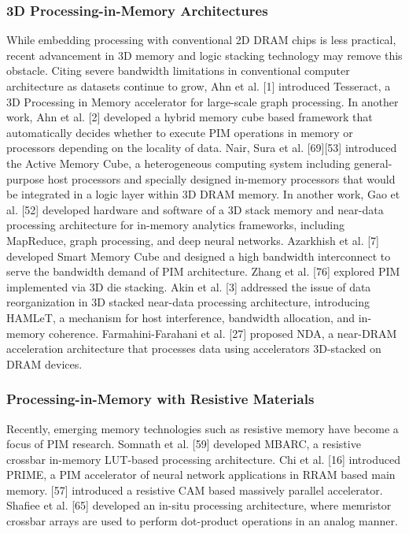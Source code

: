 \documentclass{superfri}
\begin{document}
\subsubsection{3D Processing-in-Memory Architectures}
\label{sec:3D_PiM}
While embedding processing with conventional 2D DRAM chips is less practical, recent advancement in 3D memory and logic stacking technology may remove this obstacle. Citing severe bandwidth limitations in conventional computer architecture as datasets continue to grow, Ahn et al. [1] introduced Tesseract, a 3D Processing in Memory accelerator for large-scale graph processing. In another work, Ahn et al. [2] developed a hybrid memory cube based framework that automatically decides whether to execute PIM operations in memory or processors depending on the locality of data. Nair, Sura et al. [69][53] introduced the Active Memory Cube, a heterogeneous computing system including general-purpose host processors and specially designed in-memory processors that would be integrated in a logic layer within 3D DRAM memory. In another work, Gao et al. [52] developed hardware and software of a 3D stack memory and near-data processing architecture for in-memory analytics frameworks, including MapReduce, graph processing, and deep neural networks. Azarkhish et al. [7] developed Smart Memory Cube and designed a high bandwidth interconnect to serve the bandwidth demand of PIM architecture. Zhang et al. [76] explored PIM implemented via 3D die stacking. Akin et al. [3] addressed the issue of data reorganization in 3D stacked near-data processing architecture, introducing HAMLeT, a mechanism for host interference, bandwidth allocation, and in-memory coherence. Farmahini-Farahani et al. [27] proposed NDA, a near-DRAM acceleration architecture that processes data using accelerators 3D-stacked on DRAM devices.

\subsubsection{Processing-in-Memory with Resistive Materials}
\label{sec:Resistive_PiM}
Recently, emerging memory technologies such as resistive memory have become a focus of PIM research. Somnath et al. ‎[59] developed MBARC, a resistive crossbar in-memory LUT-based processing architecture. Chi et al. ‎[16] introduced PRIME, a PIM accelerator of neural network applications in RRAM based main memory. ‎[57] introduced a resistive CAM based massively parallel accelerator. Shafiee et al. [65] developed an in-situ processing architecture, where memristor crossbar arrays are used to perform dot-product operations in an analog manner. 
\end{document}
